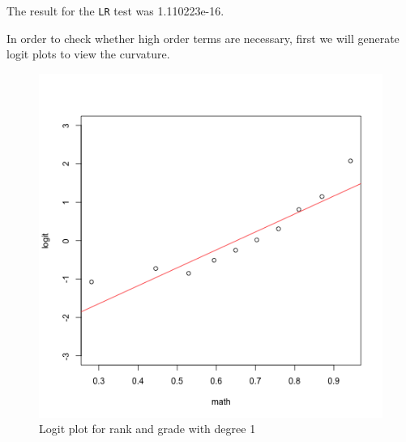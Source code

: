 \documentclass[11pt]{article}
\begin{document}
\begin{enumerate}
\begin{enumerate}
\begin{itemize}
	The result for the \verb|LR| test was 1.110223e-16.

			In order to check whether high order terms are necessary, 
			first we will generate logit plots to view the curvature. 

			\begin{figure}[H]
				\caption{Logit plot for rank and grade with degree 1}
				\begin{center}
					\includegraphics[scale=0.25]{grade_rank_logit}
				\end{center}
			\end{figure}


\end{itemize}
\end{enumerate}
\end{enumerate}
\end{document}
